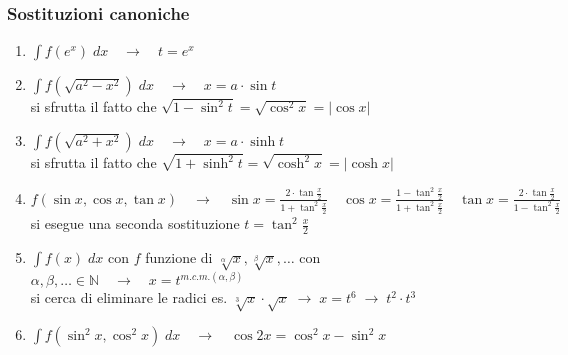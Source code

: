 \documentclass[a4paper]{article}
\begin{document}
\subsubsection*{Sostituzioni canoniche}
\begin{enumerate}
	\item \(\displaystyle \int f(e^x) \; dx \quad \rightarrow \quad t = e^x\)
	\item \(\displaystyle \int f(\sqrt{a^2 - x^2}) \; dx \quad \rightarrow \quad x = a \cdot \sin t\) \\
	si sfrutta il fatto che \(\sqrt{1 - \sin^2 t} = \sqrt{\cos^2 x} = \left|\cos x\right|\)
	\item \(\displaystyle \int f(\sqrt{a^2 + x^2}) \; dx \quad \rightarrow \quad x = a \cdot \sinh t\) \\
	si sfrutta il fatto che \(\sqrt{1 + \sinh^2 t} = \sqrt{\cosh^2 x} = \left|\cosh x\right|\)
	\item \(\displaystyle f(\sin x, \cos x, \tan x) \quad \rightarrow \quad \sin x = \frac{2 \cdot \tan \frac{x}{2}}{1 + \tan^2 \frac{x}{2}} \quad \cos x = \frac{1 - \tan^2 \frac{x}{2}}{1 + \tan^2 \frac{x}{2}} \quad \tan x = \frac{2 \cdot \tan \frac{x}{2}}{1 - \tan^2 \frac{x}{2}}\) \\
	si esegue una seconda sostituzione \(t = \tan^2 \frac{x}{2}\)
	\item \(\displaystyle \int f(x) \; dx\) con \(f\) funzione di \(\sqrt[\alpha]{x}, \sqrt[\beta]{x}, \dots\) con \(\alpha, \beta, \dots \in \mathbb{N} \quad \rightarrow \quad x = t^{m.c.m.(\alpha, \beta)}\) \\
	si cerca di eliminare le radici es. \(\sqrt[3]{x} \cdot \sqrt{x} \; \rightarrow \; x = t^6 \; \rightarrow \; t^2 \cdot t^3\)
	\item \(\displaystyle \int f(\sin^2 x, \cos^2 x) \; dx \quad \rightarrow \quad \cos 2x = \cos^2 x - \sin^2 x\)
\end{enumerate}

\newpage
\end{document}
